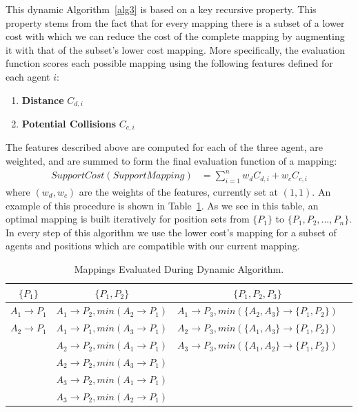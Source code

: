 This dynamic Algorithm~\ref{alg3} is based on a key recursive property. This property stems from the fact that for every mapping there is a subset of a lower cost with which we can reduce the cost of the complete mapping by augmenting it with that of the subset's lower cost mapping.
More specifically, the evaluation function scores each possible mapping using the following features defined for each agent $i$: 
\begin{enumerate}
\item \textbf{Distance} $C_{d,i}$
\item \textbf{Potential Collisions} $C_{c,i}$
\end{enumerate}
The features described above are computed for each of the three agent, are weighted, and are summed to form the final evaluation function of a mapping: 
\begin{align*}
SupportCost(SupportMapping) &= \sum_{i=1}^n w_dC_{d,i}+w_cC_{c,i}
\end{align*}
where $(w_d,w_c)$ are the weights of the features, currently set at $(1,1)$. An example of this procedure is shown in Table~\ref{tab:DynamicTable}. As we see in this table, an optimal mapping is built iteratively for position sets from $\lbrace P_{1} \rbrace$ to $\lbrace P_{1},P_{2},...,P_{n} \rbrace$. In every step of this algorithm we use the lower cost's mapping for a subset of agents and positions which are compatible with our current mapping.
\begin{table}[t!]
\label{tab:DynamicTable}
\centering
    \begin{tabular}{ | c | c | c | p{5cm} |}
    \hline
    $\lbrace P_{1} \rbrace$   & $\lbrace P_{1},P_{2} \rbrace$ 	& $\lbrace P_{1},P_{2},P_{3} \rbrace$\\ \hline
    $A_{1} \rightarrow P_{1}$ & $A_{1} \rightarrow P_{2},min(A_{2} \rightarrow P_{1})$	 	& $A_{1} \rightarrow P_{3},min(\lbrace A_{2},A_{3} \rbrace \rightarrow \lbrace P_{1},P_{2} \rbrace)$  \\ \hline
    $A_{2} \rightarrow P_{1}$ & $A_{1} \rightarrow P_{1},min(A_{3} \rightarrow P_{1})$	 	& $A_{2} \rightarrow P_{3},min(\lbrace A_{1},A_{3} \rbrace \rightarrow \lbrace P_{1},P_{2} \rbrace)$  \\ \hline
     						  & $A_{2} \rightarrow P_{2},min(A_{1} \rightarrow P_{1})$ 		& $A_{3} \rightarrow P_{3},min(\lbrace A_{1},A_{2} \rbrace \rightarrow \lbrace P_{1},P_{2} \rbrace)$  \\ \hline
       						  & $A_{2} \rightarrow P_{2},min(A_{3} \rightarrow P_{1})$ 		&   \\ \hline
       						  & $A_{3} \rightarrow P_{2},min(A_{1} \rightarrow P_{1})$ 		&   \\ \hline
    						  & $A_{3} \rightarrow P_{2},min(A_{2} \rightarrow P_{1})$		&   \\
    \hline

    \end{tabular}
    
    \caption{Mappings Evaluated During Dynamic Algorithm.}    
\end{table}
